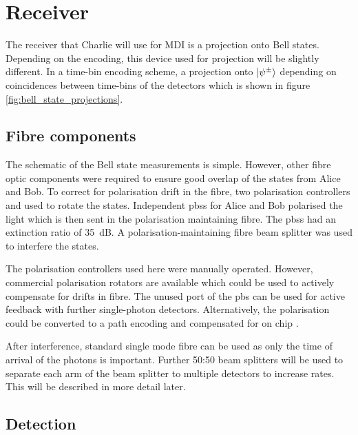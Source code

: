 \section{Receiver}

The receiver that Charlie will use for \ac{MDI} is a projection onto Bell states. Depending on the encoding, this device used for projection will be slightly different. In a time-bin encoding scheme, a projection onto $\ket{\psi^\pm}$ depending on coincidences between time-bins of the detectors which is shown in figure \ref{fig:bell_state_projections}.

\subsection{Fibre components}

The schematic of the Bell state measurements is simple. However, other fibre optic components were required to ensure good overlap of the states from Alice and Bob. To correct for polarisation drift in the fibre, two polarisation controllers and used to rotate the states. Independent \acp{pbs} for Alice and Bob polarised the light which is then sent in the polarisation maintaining fibre. The \acp{pbs} had an extinction ratio of \SI{35}{dB}. A polarisation-maintaining fibre beam splitter was used to interfere the states.

The polarisation controllers used here were manually operated. However, commercial polarisation rotators are available which could be used to actively compensate for drifts in fibre. The unused port of the \ac{pbs} can be used for active feedback with further single-photon detectors. Alternatively, the polarisation could be converted to a path encoding and compensated for on chip \cite{wang2016}.

After interference, standard single mode fibre can be used as only the time of arrival of the photons is important. Further {50:50} beam splitters will be used to separate each arm of the beam splitter to multiple detectors to increase rates. This will be described in more detail later.



\subsection{Detection}

